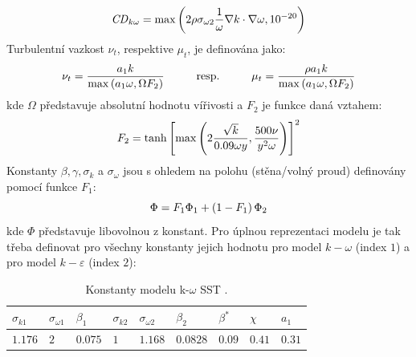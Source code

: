        \begin{equation}
            \mathord{\mathit{CD}}_{k \omega} = \max \left( 2 \rho \sigma _{\omega 2} \frac{1}{\omega} \nabla k \cdot \nabla \omega, 10^{-20} \right)
        \end{equation}
        Turbulentní vazkost $\nu _t$, respektive $\mu _t$, je definována jako:
        \begin{equation} \label{eq:turbulentni-vazkost}
            \nu _t = \frac{a_1 k}{\max \left( a_1 \omega, \Omega F_2 \right)} \hspace{1cm} \textrm{resp.} \hspace{1cm} \mu _t = \frac{\rho a_1 k}{\max \left( a_1 \omega, \Omega F_2 \right)}
        \end{equation}
        \noindent kde $\Omega$ představuje absolutní hodnotu vířivosti a $F_2$ je funkce daná vztahem:
        \begin{equation}
            F_2 = \tanh \left[ \max \left( 2\frac{\sqrt{k}}{0.09 \omega y}, \frac{500 \nu}{y^2 \omega} \right) \right]^2
        \end{equation}
        \newpage
        Konstanty $\beta, \gamma, \sigma _k$ a $\sigma _\omega$ jsou s ohledem na polohu (stěna/volný proud) definovány pomocí funkce $F_1$:
        \begin{equation}
            \Phi = F_1 \Phi _1 + \left( 1 - F_1 \right) \Phi _2
        \end{equation}
        \noindent kde $\Phi$ představuje libovolnou z konstant. Pro úplnou reprezentaci modelu je tak třeba definovat pro všechny konstanty jejich hodnotu pro model $k-\omega$ (index $1$) a pro model $k-\varepsilon$ (index $2$):

        \begin{table}[ht!]
            \centering
            \caption{Konstanty modelu k-$\omega$ SST \cite{Ansys2020Theory}.}
            \begin{tabular}{l|l|l|l|l|l|l|l|l}
                $\sigma _{k 1}$ & $\sigma _{\omega 1}$ & $\beta _1$ & $\sigma _{k 2}$ & $\sigma _{\omega 2}$ & $\beta _2$ & $\beta ^*$      & $\chi$               & $a_1$   \\ \hline
                $1.176$         & $2$                  & $0.075   $ & $1$             & $1.168$              & $0.0828$   & $0.09$          & $0.41$               & $0.31$  \\           
            \end{tabular}
            \label{tab:konstanty-turbulence}
        \end{table}

